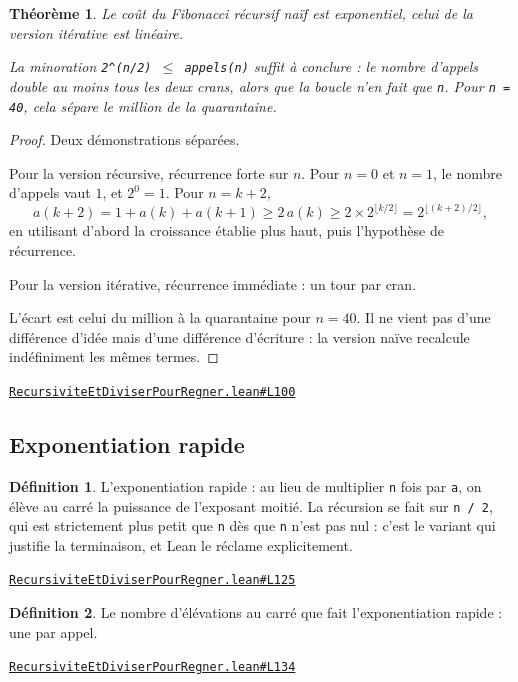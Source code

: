 \documentclass[11pt,a4paper]{article}
\theoremstyle{definition}
\newtheorem{definition}{Définition}
\theoremstyle{plain}
\newtheorem{theoreme}{Théorème}
\newcommand{\source}[2]{\par\smallskip\noindent\hfill{\footnotesize\href{#1}{\texttt{#2}}}\par\smallskip}
\begin{document}
\begin{theoreme}
Le coût du Fibonacci récursif naïf est exponentiel, celui de la version
itérative est linéaire.

La minoration \texttt{2\textasciicircum{}(n/2) \(\le\) appels(n)} suffit à conclure : le nombre d'appels double au
moins tous les deux crans, alors que la boucle n'en fait que \texttt{n}. Pour \texttt{n = 40}, cela
sépare le million de la quarantaine.
\end{theoreme}
\begin{proof}
Deux démonstrations séparées.

Pour la version récursive, récurrence forte sur \(n\). Pour \(n = 0\) et \(n = 1\), le
nombre d'appels vaut \(1\), et \(2^0 = 1\). Pour \(n = k+2\),
\[ a(k+2) = 1 + a(k) + a(k+1) \ge 2\,a(k)
   \ge 2 \times 2^{\lfloor k/2 \rfloor} = 2^{\lfloor (k+2)/2 \rfloor} , \]
en utilisant d'abord la croissance établie plus haut, puis l'hypothèse de récurrence.

Pour la version itérative, récurrence immédiate : un tour par cran.

L'écart est celui du million à la quarantaine pour \(n = 40\). Il ne vient pas d'une
différence d'idée mais d'une différence d'écriture : la version naïve recalcule
indéfiniment les mêmes termes.
\end{proof}
\source{https://github.com/Commutator-IO/learn-lean/blob/main/courses/02-lycee/11-informatique-nsi/RecursiviteEtDiviserPourRegner.lean\#L100}{RecursiviteEtDiviserPourRegner.lean\#L100}

\subsection{Exponentiation rapide}

\begin{definition}
L'exponentiation rapide : au lieu de multiplier \texttt{n} fois par \texttt{a}, on élève au
carré la puissance de l'exposant moitié. La récursion se fait sur \texttt{n / 2}, qui est
strictement plus petit que \texttt{n} dès que \texttt{n} n'est pas nul : c'est le variant qui
justifie la terminaison, et Lean le réclame explicitement.
\end{definition}
\source{https://github.com/Commutator-IO/learn-lean/blob/main/courses/02-lycee/11-informatique-nsi/RecursiviteEtDiviserPourRegner.lean\#L125}{RecursiviteEtDiviserPourRegner.lean\#L125}

\begin{definition}
Le nombre d'élévations au carré que fait l'exponentiation rapide : une par
appel.
\end{definition}
\source{https://github.com/Commutator-IO/learn-lean/blob/main/courses/02-lycee/11-informatique-nsi/RecursiviteEtDiviserPourRegner.lean\#L134}{RecursiviteEtDiviserPourRegner.lean\#L134}
\end{document}
